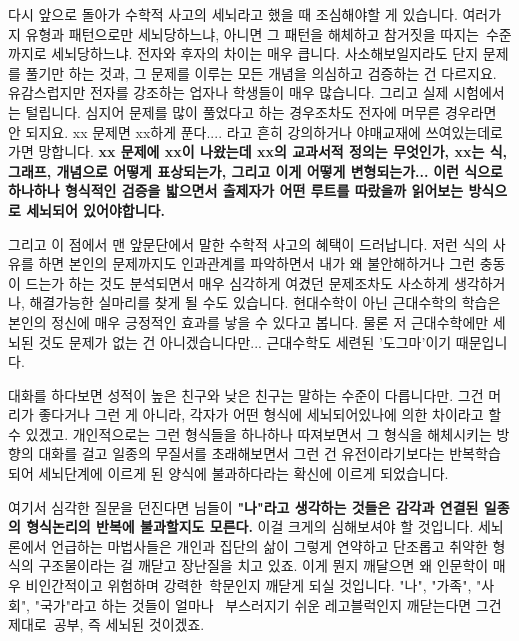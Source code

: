 다시 앞으로 돌아가 수학적 사고의 세뇌라고 했을 때 조심해야할 게 있습니다.
여러가지 유형과 패턴으로만 세뇌당하느냐, 아니면 그 패턴을 해체하고 참거짓을 따지는 수준까지로 세뇌당하느냐.
전자와 후자의 차이는 매우 큽니다. 사소해보일지라도 단지 문제를 풀기만 하는 것과, 그 문제를 이루는 모든 개념을 의심하고 검증하는 건 다르지요.
유감스럽지만 전자를 강조하는 업자나 학생들이 매우 많습니다. 그리고 실제 시험에서는 털립니다.
심지어 문제를 많이 풀었다고 하는 경우조차도 전자에 머무른 경우라면 안 되지요.
xx 문제면 xx하게 푼다.... 라고 흔히 강의하거나 야매교재에 쓰여있는데로 가면 망합니다.
\textbf{xx 문제에 xx이 나왔는데 xx의 교과서적 정의는 무엇인가, xx는 식, 그래프, 개념으로 어떻게 표상되는가, 그리고 이게 어떻게 변형되는가...}
\textbf{이런 식으로 하나하나 형식적인 검증을 밟으면서 출제자가 어떤 루트를 따랐을까 읽어보는 방식으로 세뇌되어 있어야합니다.}
\vspace{5mm}

그리고 이 점에서 맨 앞문단에서 말한 수학적 사고의 혜택이 드러납니다.
저런 식의 사유를 하면 본인의 문제까지도 인과관계를 파악하면서 내가 왜 불안해하거나 그런 충동이 드는가 하는 것도 분석되면서
매우 심각하게 여겼던 문제조차도 사소하게 생각하거나, 해결가능한 실마리를 찾게 될 수도 있습니다.
현대수학이 아닌 근대수학의 학습은 본인의 정신에 매우 긍정적인 효과를 낳을 수 있다고 봅니다.
물론 저 근대수학에만 세뇌된 것도 문제가 없는 건 아니겠습니다만...
근대수학도 세련된 '도그마'이기 때문입니다.
\vspace{5mm}

대화를 하다보면 성적이 높은 친구와 낮은 친구는 말하는 수준이 다릅니다만.
그건 머리가 좋다거나 그런 게 아니라, 각자가 어떤 형식에 세뇌되어있나에 의한 차이라고 할 수 있겠고.
개인적으로는 그런 형식들을 하나하나 따져보면서 그 형식을 해체시키는 방향의 대화를 걸고 일종의 무질서를 초래해보면서
그런 건 유전이라기보다는 반복학습되어 세뇌단계에 이르게 된 양식에 불과하다라는 확신에 이르게 되었습니다.
\vspace{5mm}

여기서 심각한 질문을 던진다면 님들이
\textbf{"나"라고 생각하는 것들은 감각과 연결된 일종의 형식논리의 반복에 불과할지도 모른다.}
이걸 크게의 심해보셔야 할 것입니다.
세뇌론에서 언급하는 마법사들은 개인과 집단의 삶이 그렇게 연약하고 단조롭고 취약한 형식의 구조물이라는 걸 깨닫고 장난질을 치고 있죠.
이게 뭔지 깨달으면 왜 인문학이 매우 비인간적이고 위험하며 강력한 학문인지 깨닫게 되실 것입니다.
"나", "가족", "사회", "국가"라고 하는 것들이 얼마나  부스러지기 쉬운 레고블럭인지 깨닫는다면 그건 제대로 공부, 즉 세뇌된 것이겠죠.
\vspace{5mm}







